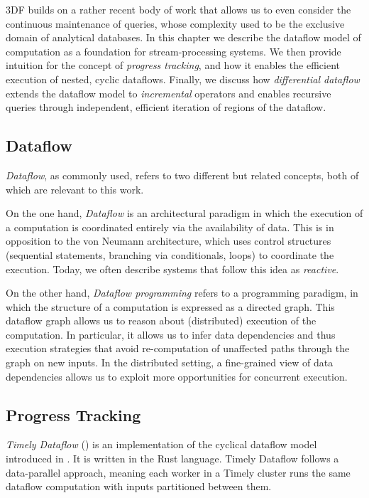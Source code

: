 \documentclass[../index.tex]{subfiles}
\begin{document}
3DF builds on a rather recent body of work that allows us to even
consider the continuous maintenance of queries, whose complexity used
to be the exclusive domain of analytical databases. In this chapter we
describe the dataflow model of computation as a foundation for
stream-processing systems. We then provide intuition for the concept
of \emph{progress tracking}, and how it enables the efficient
execution of nested, cyclic dataflows. Finally, we discuss how
\emph{differential dataflow} extends the dataflow model to
\emph{incremental} operators and enables recursive queries through
independent, efficient iteration of regions of the dataflow.

\subsection{Dataflow}

\emph{Dataflow}, as commonly used, refers to two different but related
concepts, both of which are relevant to this work.

On the one hand, \emph{Dataflow} is an architectural paradigm in which
the execution of a computation is coordinated entirely via the
availability of data. This is in opposition to the von Neumann
architecture, which uses control structures (sequential statements,
branching via conditionals, loops) to coordinate the execution. Today,
we often describe systems that follow this idea as \emph{reactive}.

On the other hand, \emph{Dataflow programming} refers to a programming
paradigm, in which the structure of a computation is expressed as a
directed graph. This dataflow graph allows us to reason about
(distributed) execution of the computation. In particular, it allows
us to infer data dependencies and thus execution strategies that avoid
re-computation of unaffected paths through the graph on new inputs. In
the distributed setting, a fine-grained view of data dependencies
allows us to exploit more opportunities for concurrent execution.

\subsection{Progress Tracking}

\emph{Timely Dataflow} (\cite{timely}) is an implementation of the
cyclical dataflow model introduced in \cite{murray2013naiad}. It is
written in the Rust language. Timely Dataflow follows a data-parallel
approach, meaning each worker in a Timely cluster runs the same
dataflow computation with inputs partitioned between them.
\end{document}

